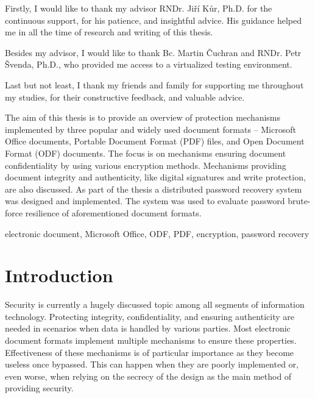 \documentclass[11pt,oneside]{fithesis2}
\begin{document}
\FrontMatter
\ThesisTitlePage

\begin{ThesisDeclaration}
\DeclarationText
\AdvisorName
\end{ThesisDeclaration}

\begin{ThesisThanks}
Firstly, I would like to thank my advisor RNDr. Jiří Kůr, Ph.D. for the continuous support, for his patience, and insightful advice. His guidance helped me in all the time of research and writing of this thesis. 

Besides my advisor, I would like to thank Bc. Martin Čuchran and  RNDr. Petr Švenda, Ph.D., who provided me access to a virtualized testing environment. 

Last but not least, I thank my friends and family for supporting me throughout my studies, for their constructive feedback, and valuable advice. 
\end{ThesisThanks}

\begin{ThesisAbstract}
The aim of this thesis is to provide an overview of protection mechanisms implemented by three popular and widely used document formats -- Microsoft Office documents, Portable Document Format (PDF) files, and Open Document Format (ODF) documents. The focus is on mechanisms ensuring document confidentiality by using various encryption methods. Mechanisms providing document integrity and authenticity, like digital signatures and write protection, are also discussed. As part of the thesis a distributed password recovery system was designed and implemented. The system was used to evaluate password brute-force resilience of aforementioned document formats.  
\end{ThesisAbstract}

\begin{ThesisKeyWords}
electronic document, Microsoft Office, ODF, PDF, encryption, password recovery
\end{ThesisKeyWords}

\MainMatter

\tableofcontents 
\chapter{Introduction}

Security is currently a hugely discussed topic among all segments of information technology. Protecting integrity, confidentiality, and ensuring authenticity are needed in scenarios when data is handled by various parties. Most electronic document formats implement multiple mechanisms to ensure these properties. Effectiveness of these mechanisms is of particular importance as they become useless once bypassed. This can happen when they are poorly implemented or, even worse, when relying on the secrecy of the design as the main method of providing security.
\end{document}
